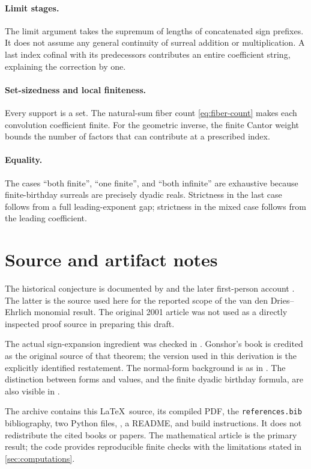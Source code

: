 \documentclass[11pt,letterpaper]{article}
\theoremstyle{definition}
\theoremstyle{remark}
\begin{document}
\paragraph{Limit stages.}
The limit argument takes the supremum of lengths of concatenated sign
prefixes. It does not assume any general continuity of surreal addition
or multiplication. A last index cofinal with its predecessors contributes
an entire coefficient string, explaining the correction by one.

\paragraph{Set-sizedness and local finiteness.}
Every support is a set. The natural-sum fiber count
\eqref{eq:fiber-count} makes each convolution coefficient finite.
For the geometric inverse, the finite Cantor weight bounds the number
of factors that can contribute at a prescribed index.

\paragraph{Equality.}
The cases ``both finite'', ``one finite'', and ``both infinite'' are
exhaustive because finite-birthday surreals are precisely dyadic reals.
Strictness in the last case follows from a full leading-exponent gap;
strictness in the mixed case follows from the leading coefficient.

\section{Source and artifact notes}

The historical conjecture is documented by \cite{OPG} and the later
first-person account \cite{EhrlichMO}. The latter is the source used here
for the reported scope of the van den Dries--Ehrlich monomial result.
The original 2001 article was not used as a directly inspected proof
source in preparing this draft.

The actual sign-expansion ingredient was checked in
\cite[Definition~2.20 and Theorem~2.21, printed p.~13]{BournezGuilmant}.
Gonshor's book is credited as the original source of that theorem; the
version used in this derivation is the explicitly identified restatement.
The normal-form background is as in \cite{Berarducci}. The distinction
between forms and values, and the finite dyadic birthday formula, are
also visible in \cite{Roughan}.

The archive contains this \LaTeX\ source, its compiled PDF, the
\texttt{references.bib} bibliography, two Python files,
, a README, and build instructions. It does not
redistribute the cited books or papers. The mathematical article is the
primary result; the code provides reproducible finite checks with the
limitations stated in \cref{sec:computations}.
\end{document}
